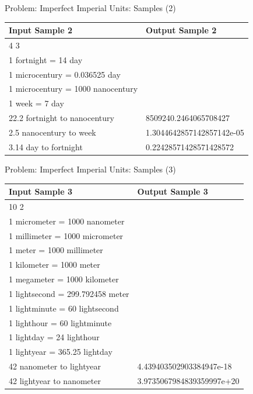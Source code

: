 \documentclass[11pt,pdf, aspectratio=169]{beamer}
\begin{document}
  \begin{frame}{Problem: Imperfect Imperial Units: Samples (2)}
    \begin{tabular}{|l|l|}
      \hline
      Input Sample 2                    & Output Sample 2           \\
      \hline
      4 3                               &                           \\
      1 fortnight = 14 day              &                           \\
      1 microcentury = 0.036525 day     &                           \\
      1 microcentury = 1000 nanocentury &                           \\
      1 week = 7 day                    &                           \\
      22.2 fortnight to nanocentury     & 8509240.2464065708427     \\
      2.5 nanocentury to week           & 1.3044642857142857142e-05 \\
      3.14 day to fortnight             & 0.22428571428571428572    \\
      \hline
    \end{tabular}
  \end{frame}

  \begin{frame}{Problem: Imperfect Imperial Units: Samples (3)}
    \begin{tabular}{|l|l|}
      \hline
      Input Sample 3                   & Output Sample 3           \\
      \hline
      10 2                             &                           \\
      1 micrometer = 1000 nanometer    &                           \\
      1 millimeter = 1000 micrometer   &                           \\
      1 meter = 1000 millimeter        &                           \\
      1 kilometer = 1000 meter         &                           \\
      1 megameter = 1000 kilometer     &                           \\
      1 lightsecond = 299.792458 meter &                           \\
      1 lightminute = 60 lightsecond   &                           \\
      1 lighthour = 60 lightminute     &                           \\
      1 lightday = 24 lighthour        &                           \\
      1 lightyear = 365.25 lightday    &                           \\
      42 nanometer to lightyear        & 4.439403502903384947e-18  \\
      42 lightyear to nanometer        & 3.9735067984839359997e+20 \\
      \hline
    \end{tabular}
  \end{frame}
\end{document}
